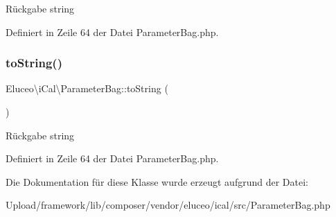 \begin{DoxyReturn}{Rückgabe}
string 
\end{DoxyReturn}


Definiert in Zeile 64 der Datei Parameter\+Bag.\+php.

\mbox{\label{class_eluceo_1_1i_cal_1_1_parameter_bag_a3dbe3cb1bc77cd42647b9c3b9cc1cd74}} 
\subsubsection{\texorpdfstring{to\+String()}{toString()}\hspace{0.1cm}{\footnotesize\ttfamily [3/3]}}
{\footnotesize\ttfamily Eluceo\textbackslash{}i\+Cal\textbackslash{}\+Parameter\+Bag\+::to\+String (\begin{DoxyParamCaption}{ }\end{DoxyParamCaption})}

\begin{DoxyReturn}{Rückgabe}
string 
\end{DoxyReturn}


Definiert in Zeile 64 der Datei Parameter\+Bag.\+php.



Die Dokumentation für diese Klasse wurde erzeugt aufgrund der Datei\+:\begin{DoxyCompactItemize}
\item 
Upload/framework/lib/composer/vendor/eluceo/ical/src/Parameter\+Bag.\+php\end{DoxyCompactItemize}
